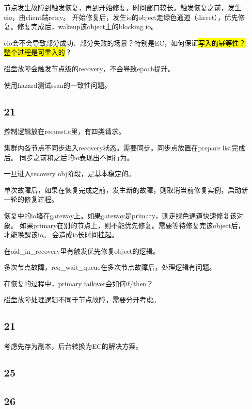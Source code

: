 节点发生故障到触发恢复，再到开始修复，时间窗口较长。触发恢复之前，发生eio，由client端retry。
开始修复后，发生io的object走绿色通道（direct），优先修复。修复完成后，wakeup该object上的blocking io。

eio会不会导致部分成功、部分失败的场景？特别是EC，如何保证\hl{写入的幂等性？整个过程是可重入的}？

磁盘故障会触发节点级的recovery，不会导致epoch提升。

使用hazard测试ssan的一致性问题。

\subsection{21}

控制逻辑放在request.c里，有四类请求。

集群内各节点不同步进入recovery状态。需要同步。同步点放置在prepare list完成后。
同步之前和之后的io表现出不同行为。

一旦进入recovery obj阶段，是基本稳定的。

\hrulefill

单次故障后，如果在恢复完成之前，发生新的故障，则取消当前修复实例，启动新一轮的修复过程。

恢复中的io堵在gateway上。如果gateway是primary，则走绿色通道快速修复该对象。
如果primary在别的节点上，则不能优先修复。需要等待修复完该object后，才能唤醒该io。
会造成io长时间挂起。

在oid\_in\_recovery里有触发优先修复object的逻辑。

\hrulefill

多次节点故障，req\_wait\_queue在多次节点故障后，处理逻辑有问题。

\hrulefill

在恢复的过程中，primary failover会如何if/then？

磁盘故障处理逻辑不同于节点故障，需要分开考虑。

\subsection{21}

考虑先存为副本，后台转换为EC的解决方案。

\subsection{25}

\subsection{26}

